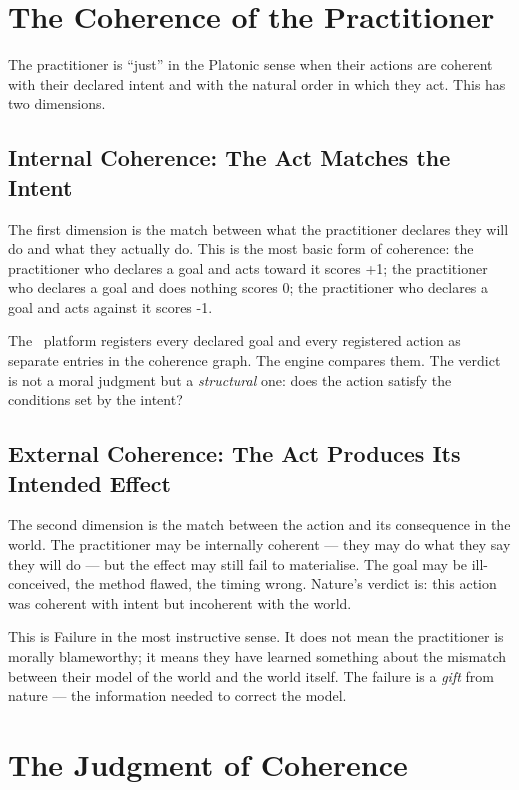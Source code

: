 \section{The Coherence of the Practitioner}

The practitioner is ``just'' in the Platonic sense when their actions are
coherent with their declared intent and with the natural order in which they
act. This has two dimensions.

\subsection{Internal Coherence: The Act Matches the Intent}

The first dimension is the match between what the practitioner declares they
will do and what they actually do. This is the most basic form of coherence:
the practitioner who declares a goal and acts toward it scores +1; the
practitioner who declares a goal and does nothing scores 0; the practitioner
who declares a goal and acts against it scores -1.

The \praxis\ platform registers every declared goal and every registered action
as separate entries in the coherence graph. The engine compares them. The
verdict is not a moral judgment but a \emph{structural} one: does the action
satisfy the conditions set by the intent?

\subsection{External Coherence: The Act Produces Its Intended Effect}

The second dimension is the match between the action and its consequence in the
world. The practitioner may be internally coherent --- they may do what they
say they will do --- but the effect may still fail to materialise. The goal may
be ill-conceived, the method flawed, the timing wrong. Nature's verdict is:
this action was coherent with intent but incoherent with the world.

This is Failure in the most instructive sense. It does not mean the practitioner
is morally blameworthy; it means they have learned something about the mismatch
between their model of the world and the world itself. The failure is a \emph{gift}
from nature --- the information needed to correct the model.

\section{The Judgment of Coherence}

